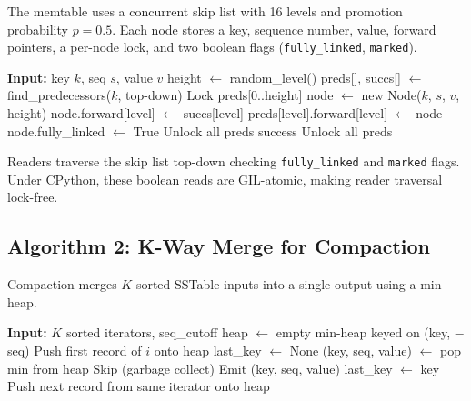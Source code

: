 \documentclass[oneside,a4paper,12pt]{book}
\begin{document}
The memtable uses a concurrent skip list with 16 levels and promotion probability $p = 0.5$. Each node stores a key, sequence number, value, forward pointers, a per-node lock, and two boolean flags (\texttt{fully\_linked}, \texttt{marked}).

\begin{algorithm}[H]
\caption{Skip List Insert}
\begin{algorithmic}[1]
\STATE \textbf{Input:} key $k$, seq $s$, value $v$
\STATE height $\leftarrow$ random\_level()
\REPEAT
    \STATE preds[], succs[] $\leftarrow$ find\_predecessors($k$, top-down)
    \STATE Lock preds[0..height]
        \STATE node $\leftarrow$ new Node($k$, $s$, $v$, height)
            \STATE node.forward[level] $\leftarrow$ succs[level]
            \STATE preds[level].forward[level] $\leftarrow$ node
        \ENDFOR
        \STATE node.fully\_linked $\leftarrow$ True
        \STATE Unlock all preds
        \RETURN success
    \ENDIF
    \STATE Unlock all preds
\end{algorithmic}
\end{algorithm}

Readers traverse the skip list top-down checking \texttt{fully\_linked} and \texttt{marked} flags. Under CPython, these boolean reads are GIL-atomic, making reader traversal lock-free.

\newpage

\subsection{Algorithm 2: K-Way Merge for Compaction}

Compaction merges $K$ sorted SSTable inputs into a single output using a min-heap.

\begin{algorithm}[H]
\caption{K-Way Merge with Deduplication}
\begin{algorithmic}[1]
\STATE \textbf{Input:} $K$ sorted iterators, seq\_cutoff
\STATE heap $\leftarrow$ empty min-heap keyed on (key, $-$seq)
    \STATE Push first record of $i$ onto heap
\ENDFOR
\STATE last\_key $\leftarrow$ None
    \STATE (key, seq, value) $\leftarrow$ pop min from heap
            \STATE Skip (garbage collect)
        \ELSE
            \STATE Emit (key, seq, value)
        \ENDIF
        \STATE last\_key $\leftarrow$ key
    \ENDIF
    \STATE Push next record from same iterator onto heap
\ENDWHILE
\end{algorithmic}
\end{algorithm}
\end{document}
